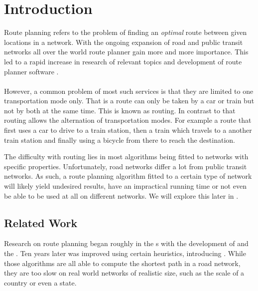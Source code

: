 \chapter{Introduction}\label{introduction}
	Route planning refers to the problem of finding an \textit{optimal} route between given locations in a network.
	With the ongoing expansion of road and public transit networks all over the world route planner gain more and
	more importance. This led to a rapid increase in research 
	of relevant topics and development of route planner software .\\\\
	However, a common problem of most such services is that they are limited to one transportation mode only.
	That is a route can only be taken by a car or train but not by both at the same time. This is known as \uniModal routing.
	In contrast to that \multiModal routing allows the alternation of transportation modes. For example a route that
	first uses a car to drive to a train station, then a train which travels to a another train station and finally
	using a bicycle from there to reach the destination.
	
	The difficulty with \multiModal routing lies in most algorithms being fitted to networks with specific properties.
	Unfortunately, road networks differ a lot from public transit networks. As such, a route planning algorithm
	fitted to a certain type of network will likely yield undesired results, have an impractical running time or not
	even be able to be used at all on different networks. We will explore this later in .

\section{Related Work}
	Research on route planning began roughly in the s with the development of \dijkstra {} and the
	\bellmanFord {}. Ten years later \dijkstra was improved using certain heuristics, introducing \astar {}.
	While those algorithms are all able to compute the shortest path in a road network, they are too slow on real world networks of
	realistic size, such as the scale of a country or even a state.
	
